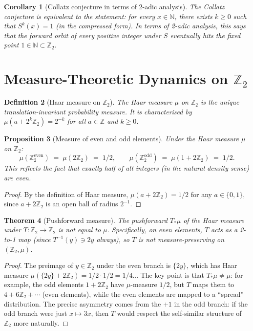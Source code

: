 \documentclass[12pt,a4paper]{article}
\newtheorem{theorem}{Theorem}[section]
\newtheorem{proposition}[theorem]{Proposition}
\newtheorem{corollary}[theorem]{Corollary}
\newtheorem{definition}[theorem]{Definition}
\begin{document}
\begin{corollary}[Collatz conjecture in terms of 2-adic analysis]\label{cor:2adic_reformulation}
The Collatz conjecture is equivalent to the statement: for every $x \in \mathbb{N}$,
there exists $k \geq 0$ such that $S^k(x) = 1$ (in the compressed form). In terms of
2-adic analysis, this says that the forward orbit of every positive integer under $S$
eventually hits the fixed point $1 \in \mathbb{N} \subset \mathbb{Z}_2$.
\end{corollary}

\section{Measure-Theoretic Dynamics on $\mathbb{Z}_2$}\label{sec:dynamics}

\begin{definition}[Haar measure on $\mathbb{Z}_2$]\label{def:haar}
The \emph{Haar measure} $\mu$ on $\mathbb{Z}_2$ is the unique translation-invariant
probability measure. It is characterised by $\mu(a + 2^k \mathbb{Z}_2) = 2^{-k}$ for
all $a \in \mathbb{Z}$ and $k \geq 0$.
\end{definition}

\begin{proposition}[Measure of even and odd elements]\label{prop:measure_parity}
Under the Haar measure $\mu$ on $\mathbb{Z}_2$:
\[
  \mu(\mathbb{Z}_2^{\text{even}}) \;=\; \mu(2\mathbb{Z}_2) \;=\; 1/2,
\qquad
  \mu(\mathbb{Z}_2^{\text{odd}}) \;=\; \mu(1 + 2\mathbb{Z}_2) \;=\; 1/2.
\]
This reflects the fact that exactly half of all integers (in the natural density sense)
are even.
\end{proposition}

\begin{proof}
By the definition of Haar measure, $\mu(a + 2\mathbb{Z}_2) = 1/2$ for any $a \in \{0,1\}$,
since $a + 2\mathbb{Z}_2$ is an open ball of radius $2^{-1}$.
\end{proof}

\begin{theorem}[Pushforward measure]\label{thm:pushforward}
The pushforward $T_* \mu$ of the Haar measure under $T\colon \mathbb{Z}_2 \to \mathbb{Z}_2$
is not equal to $\mu$. Specifically, on even elements, $T$ acts as a 2-to-1 map (since
$T^{-1}(y) \ni 2y$ always), so $T$ is not measure-preserving on $(\mathbb{Z}_2, \mu)$.
\end{theorem}

\begin{proof}
The preimage of $y \in \mathbb{Z}_2$ under the even branch is $\{2y\}$, which has Haar
measure $\mu(\{2y\} + 2\mathbb{Z}_2) = 1/2 \cdot 1/2 = 1/4$... The key point is that
$T_*\mu \neq \mu$: for example, the odd elements $1 + 2\mathbb{Z}_2$ have $\mu$-measure
$1/2$, but $T$ maps them to $4 + 6\mathbb{Z}_2 + \cdots$ (even elements), while the
even elements are mapped to a ``spread'' distribution. The precise asymmetry comes from
the $+1$ in the odd branch: if the odd branch were just $x \mapsto 3x$, then $T$ would
respect the self-similar structure of $\mathbb{Z}_2$ more naturally.
\end{proof}
\end{document}
